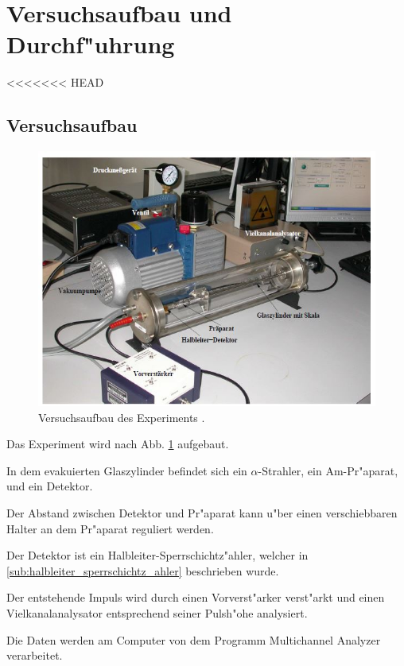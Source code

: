\section{Versuchsaufbau und Durchf"uhrung} %
<<<<<<< HEAD
\label{sec:durchf_uhrung}
	
	\subsection{Versuchsaufbau} %
	\label{sub:versuchsaufbau}
	
	\begin{figure}[!h]
		\centering
		\includegraphics[width = 13cm]{img/Aufbau.JPG}
		\caption{Versuchsaufbau des Experiments \cite{anleitung}.}
		\label{fg:aufbau}
	\end{figure}

	Das Experiment wird nach Abb. \ref{fg:aufbau} aufgebaut.

	In dem evakuierten Glaszylinder befindet sich ein $\alpha$-Strahler, ein Am-Pr"aparat, und ein Detektor.

	Der Abstand zwischen Detektor und Pr"aparat kann u"ber einen verschiebbaren Halter an dem Pr"aparat reguliert werden.

	Der Detektor ist ein Halbleiter-Sperrschichtz"ahler, welcher in \ref{sub:halbleiter_sperrschichtz_ahler} beschrieben wurde.

	Der entstehende Impuls wird durch einen Vorverst"arker verst"arkt und einen Vielkanalanalysator entsprechend seiner Pulsh"ohe analysiert.

	Die Daten werden am Computer von dem Programm Multichannel 
	Analyzer verarbeitet.

